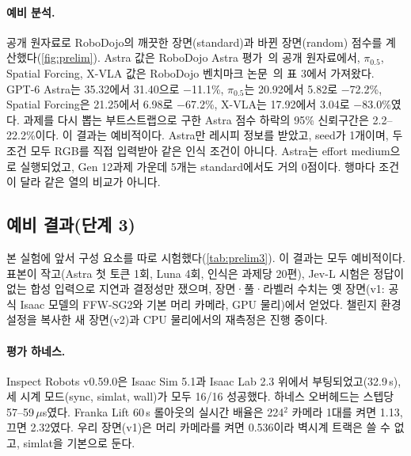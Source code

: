 \paragraph{예비 분석.}
공개 원자료로 RoboDojo의 깨끗한 장면(standard)과 바뀐 장면(random) 점수를 계산했다(\cref{fig:prelim}). Astra 값은 RoboDojo Astra 평가~\cite{robodojo2026}의 공개 원자료에서, $\pi_{0.5}$, Spatial Forcing, X-VLA 값은 RoboDojo 벤치마크 논문~\cite{robodojobench2026}의 표 3에서 가져왔다. GPT-6 Astra는 35.32에서 31.40으로 $-$11.1\%, $\pi_{0.5}$는 20.92에서 5.82로 $-$72.2\%, Spatial Forcing은 21.25에서 6.98로 $-$67.2\%, X-VLA는 17.92에서 3.04로 $-$83.0\%였다. 과제를 다시 뽑는 부트스트랩으로 구한 Astra 점수 하락의 95\% 신뢰구간은 2.2--22.2\%이다. 이 결과는 예비적이다. Astra만 레시피 정보를 받았고, seed가 1개이며, 두 조건 모두 RGB를 직접 입력받아 같은 인식 조건이 아니다. Astra는 effort medium으로 실행되었고, Gen 12과제 가운데 5개는 standard에서도 거의 0점이다. 행마다 조건이 달라 같은 열의 비교가 아니다.



\subsection{예비 결과(단계 3)}
\label{sec:prelim3}
본 실험에 앞서 구성 요소를 따로 시험했다(\cref{tab:prelim3}). 이 결과는 모두 예비적이다. 표본이 작고(Astra 첫 토큰 1회, Luna 4회, 인식은 과제당 20편), Jev-L 시험은 정답이 없는 합성 입력으로 지연과 결정성만 쟀으며, 장면·풀·라벨러 수치는 옛 장면(v1: 공식 Isaac 모델의 FFW-SG2와 기본 머리 카메라, GPU 물리)에서 얻었다. 챌린지 환경 설정을 복사한 새 장면(v2)과 CPU 물리에서의 재측정은 진행 중이다.

\paragraph{평가 하네스.}
Inspect Robots v0.59.0은 Isaac Sim 5.1과 Isaac Lab 2.3 위에서 부팅되었고(32.9\,s), 세 시계 모드(sync, simlat, wall)가 모두 16/16 성공했다. 하네스 오버헤드는 스텝당 57--59\,$\mu$s였다. Franka Lift 60\,s 롤아웃의 실시간 배율은 224$^2$ 카메라 1대를 켜면 1.13, 끄면 2.32였다. 우리 장면(v1)은 머리 카메라를 켜면 0.536이라 벽시계 트랙은 쓸 수 없고, simlat을 기본으로 둔다.

